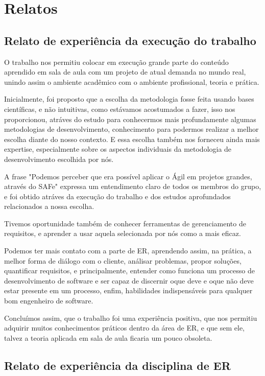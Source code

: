 \chapter{Relatos}

\section{Relato de experiência da execução do trabalho}

    O trabalho nos permitiu colocar em execução grande parte do conteúdo aprendido em sala de aula com um projeto de atual demanda no mundo real, unindo assim o ambiente acadêmico com o ambiente profissional, teoria e prática.

Inicialmente, foi proposto que a escolha da metodologia fosse feita usando bases científicas, e não intuitivas, como estávamos acostumados a fazer, isso nos proporcionou, atráves do estudo para conhecermos mais profundamente algumas metodologias de desenvolvimento, conhecimento para podermos realizar a melhor
escolha diante do nosso contexto. E essa escolha também nos forneceu ainda mais expertise, especialmente sobre os aspectos individuais da metodologia de desenvolvimento escolhida por nós.

A frase "Podemos perceber que era possível aplicar o Ágil em projetos grandes, através do SAFe" expressa um entendimento claro de todos os membros do grupo, e foi obtido atráves da execução do trabalho
e dos estudos aprofundados relacionados a nossa escolha.
    
    Tivemos oportunidade também de conhecer ferramentas de gerenciamento de requisitos, e aprender a usar
aquela selecionada por nós como a mais eficaz.
    
    Podemos ter mais contato com a parte de ER, aprendendo assim, na prática, a melhor forma de diálogo
com o cliente, análisar problemas, propor soluções, quantificar requisitos, e principalmente,
entender como funciona um processo de desenvolvimento de software e ser capaz de discernir oque deve e oque não deve estar presente em um processo, enfim, habilidades indispensáveis
para qualquer bom engenheiro de software.
    
    Concluímos assim, que o trabalho foi uma experiência positiva, que nos permitiu adquirir muitos
conhecimentos práticos dentro da área de ER, e que sem ele, talvez a teoria aplicada em sala de aula
ficaria um pouco obsoleta.

\section{Relato de experiência da disciplina  de ER}

